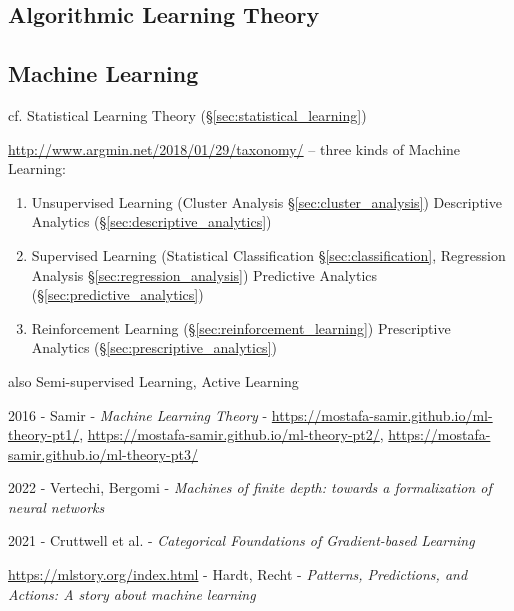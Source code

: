 


\subsection{Algorithmic Learning Theory}\label{sec:algorithmic_learning}

\subsection{Machine Learning}\label{sec:machine_learning}


cf. Statistical Learning Theory (\S\ref{sec:statistical_learning})

\url{http://www.argmin.net/2018/01/29/taxonomy/} -- three kinds of Machine
Learning:
\begin{enumerate}
  \item Unsupervised Learning (Cluster Analysis \S\ref{sec:cluster_analysis})
    \fist Descriptive Analytics (\S\ref{sec:descriptive_analytics})
  \item Supervised Learning (Statistical Classification
    \S\ref{sec:classification}, Regression Analysis
    \S\ref{sec:regression_analysis}) \fist Predictive Analytics
    (\S\ref{sec:predictive_analytics})
  \item Reinforcement Learning (\S\ref{sec:reinforcement_learning})
    \fist Prescriptive Analytics (\S\ref{sec:prescriptive_analytics})
\end{enumerate}
also Semi-supervised Learning, Active Learning

2016 - Samir - \emph{Machine Learning Theory} -
\url{https://mostafa-samir.github.io/ml-theory-pt1/},
\url{https://mostafa-samir.github.io/ml-theory-pt2/},
\url{https://mostafa-samir.github.io/ml-theory-pt3/}

2022 - Vertechi, Bergomi -
\emph{Machines of finite depth: towards a formalization of neural networks}

2021 - Cruttwell et al. - \emph{Categorical Foundations of Gradient-based
Learning}


\url{https://mlstory.org/index.html} - Hardt, Recht -
\emph{Patterns, Predictions, and Actions: A story about machine learning}

